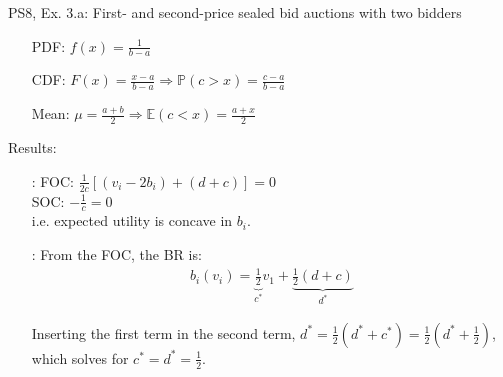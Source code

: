 \begin{frame}{PS8, Ex. 3.a: First- and second-price sealed bid auctions with two bidders}
\begin{multicols}{2}
\begin{enumerate}
        \item[PDF:] $f(x)=\frac{1}{b-a}$
        \item[CDF:] $F(x)=\frac{x-a}{b-a}\Rightarrow\mathbb{P}(c>x)=\frac{c-a}{b-a}$
        \item[Mean:] $\mu=\frac{a+b}{2}\Rightarrow\mathbb{E}(c<x)=\frac{a+x}{2}$
      \end{enumerate}
      \vspace{-6pt}
      Results:
      \vspace{-6pt}
      \begin{itemize}
        \item[\nth{2}:] FOC: $\frac{1}{2c}[(v_i-2b_i)+(d+c)]=0$\\
                        SOC: $-\frac{1}{c}=0$\\
                        i.e. expected utility is concave in $b_i$.
        \item[\nth{3}:] From the FOC, the BR is:\vspace{-6pt}
                        \begin{align*}
                          b_i(v_i)=\underbrace{\frac{1}{2}}_{c^*}v_1+\underbrace{\frac{1}{2}(d+c)}_{d^*}
                        \end{align*}
        \item[]         \vspace{-6pt} Inserting the first term in the second term, $d^*=\frac{1}{2}(d^*+c^*)=\frac{1}{2}(d^*+\frac{1}{2})$, which solves for $c^*=d^*=\frac{1}{2}$.
      \end{itemize}
      \vfill\null
    \end{multicols}
\end{frame}


